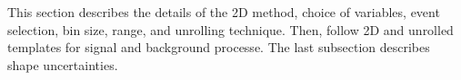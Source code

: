 This section describes the details of the 2D method,
choice of variables, event selection, bin size, range, and 
unrolling technique. Then, follow 2D and unrolled templates
for signal and background processe. The last subsection 
describes shape uncertainties.
